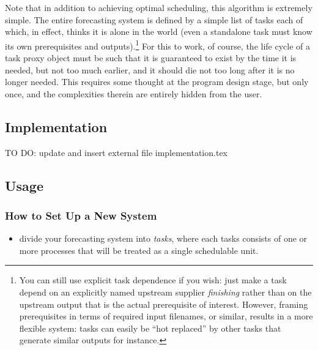 \documentclass[11pt,a4paper]{article}
\begin{document}
Note that in addition to achieving optimal scheduling, this algorithm is
extremely simple. The entire forecasting system is defined by a simple
list of tasks each of which, in effect, thinks it is alone in the world
(even a standalone task must know its own prerequisites and
outputs).\footnote{You can still use explicit task dependence if you
wish: just make a task depend on an explicitly named upstream supplier
{\em finishing} rather than on the upstream output that is the actual
prerequisite of interest. However, framing prerequisites in terms of
required input filenames, or similar, results in a more flexible system:
tasks can easily be ``hot replaced'' by other tasks that generate
similar outputs for instance.}  For this to work, of course, the life
cycle of a task proxy object must be such that it is guaranteed to exist
by the time it is needed, but not too much earlier, and it should die
not too long after it is no longer needed.  This requires some thought
at the program design stage, but only once, and the complexities therein
are entirely hidden from the user. 




\subsection{Implementation}
\label{sec:implementation}

{\huge TO DO: update and insert external file implementation.tex}


\subsection{Usage}
\label{sec:usage}


\subsubsection{How to Set Up a New System}

\begin{itemize}

\item divide your forecasting system into {\em tasks}, where each tasks
consists of one or more processes that will be treated as a single schedulable
unit.

\end{itemize}
\end{document}
